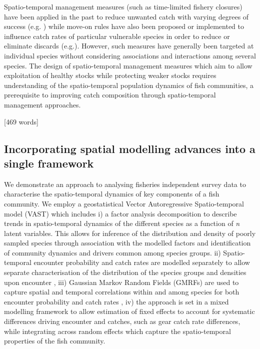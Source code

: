 \documentclass{nature}
\begin{document}
\begin{linenumbers}
Spatio-temporal management measures (such as time-limited fishery closures)
have been applied in the past to reduce unwanted catch with varying degrees of
success (e.g. \cite{Needle2011, Holmes2011, Beare2010, Dinmore2003}) while
move-on rules have also been proposed or implemented to influence catch rates
of particular vulnerable species in order to reduce or eliminate discards
(e.g.\cite{Gardner2008, Dunn2011, Dunn2014a}). However, such measures have
generally been targeted at individual species without considering associations
and interactions among several species. The design of spatio-temporal
management measures which aim to allow exploitation of healthy stocks while
protecting weaker stocks requires understanding of the spatio-temporal
population dynamics of fish communities, a prerequisite to improving catch
composition through spatio-temporal management approaches. 

[469 words]

\subsection{Incorporating spatial modelling advances into a single framework}

We demonstrate an approach to analysing fisheries independent survey data to
characterise the spatio-temporal dynamics of key components of a fish
community. We employ a geostatistical Vector Autoregressive Spatio-temporal
model (VAST) which includes i) a factor analysis decomposition to describe
trends in spatio-temporal dynamics of the different species as a function of
\textit{n} latent variables\cite{Thorson2015}. This allows for inference of the
distribution and density of poorly sampled species through association with the
modelled factors and identification of community dynamics and drivers common
among species groups. ii) Spatio-temporal encounter probability and catch rates
are modelled separately to allow separate characterisation of the distribution
of the species groups and densities upon encounter \cite{Thorson2015a}, iii)
Gaussian Markov Random Fields (GMRFs) are used to capture spatial and temporal
correlations within and among species for both encounter probability and catch
rates \cite{Thorson2013}, iv) the approach is set in a mixed modelling
framework to allow estimation of fixed effects to account for systematic
differences driving encounter and catches, such as gear catch rate differences,
while integrating across random effects which capture the spatio-temporal
properties of the fish community.


\end{linenumbers}
\end{document}
